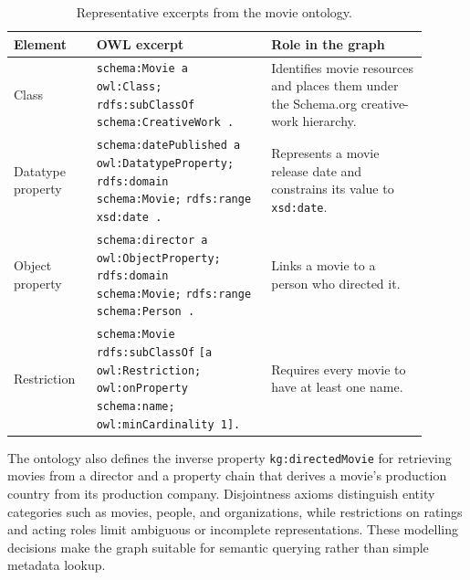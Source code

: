 \begin{table}[t]
    \centering
    \caption{Representative excerpts from the movie ontology.}
    \label{tab:ontology-excerpts}
    \small
    \begin{tabular}{p{0.18\linewidth}p{0.38\linewidth}p{0.34\linewidth}}
        \toprule
        \textbf{Element} & \textbf{OWL excerpt} & \textbf{Role in the graph} \\
        \midrule
        Class &
        \texttt{schema:Movie a owl:Class;} \newline
        \texttt{\quad rdfs:subClassOf schema:CreativeWork .}
        &
        Identifies movie resources and places them under the
        Schema.org creative-work hierarchy. \\
        \midrule
        Datatype property &
        \texttt{schema:datePublished a owl:DatatypeProperty;} \newline
        \texttt{\quad rdfs:domain schema:Movie;} \newline
        \texttt{\quad rdfs:range xsd:date .}
        &
        Represents a movie release date and constrains its value to
        \texttt{xsd:date}. \\
        \midrule
        Object property &
        \texttt{schema:director a owl:ObjectProperty;} \newline
        \texttt{\quad rdfs:domain schema:Movie;} \newline
        \texttt{\quad rdfs:range schema:Person .}
        &
        Links a movie to a person who directed it. \\
        \midrule
        Restriction &
        \texttt{schema:Movie rdfs:subClassOf} \newline
        \texttt{\quad [a owl:Restriction;} \newline
        \texttt{\quad\quad owl:onProperty schema:name;} \newline
        \texttt{\quad\quad owl:minCardinality 1].}
        &
        Requires every movie to have at least one name. \\
        \bottomrule
    \end{tabular}
\end{table}

The ontology also defines the inverse property
\texttt{kg:directedMovie} for retrieving movies from a director and a
property chain that derives a movie's production country from its production
company. Disjointness axioms distinguish entity categories such as movies,
people, and organizations, while restrictions on ratings and acting roles
limit ambiguous or incomplete representations. These modelling decisions
make the graph suitable for semantic querying rather than simple metadata
lookup.

